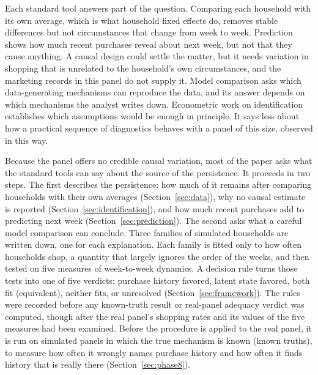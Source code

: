 \documentclass[11pt]{article}
\begin{document}
Each standard tool answers part of the question. Comparing each household with its own
average, which is what household fixed effects do, removes stable differences but not
circumstances that change from week to week. Prediction shows how much recent purchases
reveal about next week, but not that they cause anything. A causal design could settle the
matter, but it needs variation in shopping that is unrelated to the household's own
circumstances, and the marketing records in this panel do not supply it. Model comparison
asks which data-generating mechanisms can reproduce the data, and its answer depends on which
mechanisms the analyst writes down. Econometric work on identification
\citep{honore_kyriazidou,torgovitsky2019} establishes which assumptions would be enough in
principle. It says less about how a practical sequence of diagnostics behaves with a panel
of this size, observed in this way.

Because the panel offers no credible causal variation, most of the paper asks what the
standard tools can say about the source of the persistence. It proceeds in two steps. The
first describes the persistence: how much of it remains after comparing households with
their own averages (Section~\ref{sec:data}), why no causal estimate is reported
(Section~\ref{sec:identification}), and how much recent purchases add to predicting next week
(Section~\ref{sec:prediction}). The second asks what a careful model comparison can conclude.
Three families of simulated households are written down, one for each explanation. Each
family is fitted only to how often households shop, a quantity that largely ignores the order
of the weeks, and then tested on five measures of week-to-week dynamics. A decision rule turns those
tests into one of five verdicts: purchase history favored, latent state favored, both fit
(equivalent), neither fits, or unresolved (Section~\ref{sec:framework}). The rules were recorded before any
known-truth result or real-panel adequacy verdict was computed, though after the real panel's
shopping rates and its values of the five measures had been examined. Before the procedure is
applied to the real panel, it is run on simulated
panels in which the true mechanism is known (known truths), to measure how often it wrongly
names purchase history and how often it finds history that is really there
(Section~\ref{sec:phase8}).
\end{document}
